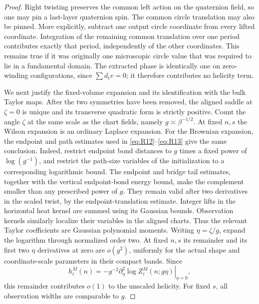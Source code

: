 \begin{proof}
Right twisting preserves the common left action on the quaternion field,
so one may pin a last-layer quaternion spin. The common circle translation
may also be pinned. More explicitly, subtract one output circle coordinate
from every lifted coordinate. Integration of the remaining common
translation over one period contributes exactly that period, independently
of the other coordinates. This remains true if it was originally one
microscopic circle value that was required to lie in a fundamental domain.
The extracted phase is identically one on zero-winding configurations,
since $\sum d_t v=0$; it therefore contributes no helicity term.

We next justify the fixed-volume expansion and its identification with the
bulk Taylor maps. After the two symmetries have been removed, the aligned
saddle at $\zeta=0$ is unique and its transverse quadratic form is strictly
positive. Count the angle $\zeta$ at the same scale as the chart fields,
namely $g\asymp\beta^{-1/2}$. At fixed $n,s$ the Wilson expansion is an
ordinary Laplace expansion. For the Brownian expansion, the endpoint and
path estimates used in \eqref{eq:R12}--\eqref{eq:R13} give the same
conclusion. Indeed, restrict endpoint bond distances to $g$ times a fixed
power of $\log(g^{-1})$, and restrict the path-size variables of the
initialization to a corresponding logarithmic bound. The endpoint and
bridge tail estimates, together with the vertical endpoint-bond energy
bound, make the complement smaller than any prescribed power of $g$.
They remain valid after two derivatives in the scaled twist, by the
endpoint-translation estimate. Integer lifts in the horizontal heat
kernel are summed using its Gaussian bounds. Observation kernels similarly
localize their variables in the aligned charts. Thus the relevant Taylor
coefficients are Gaussian polynomial moments. Writing $\eta=\zeta/g$,
expand the logarithm through normalized order two. At fixed $n,s$ its
remainder and its first two $\eta$ derivatives at zero are $o(g^2)$,
uniformly for the actual shape and coordinate-scale parameters in
their compact bands. Since
\[
 h_i^M(n)=-g^{-2}\left.\partial_\eta^2
                    \log Z_i^M(n;g\eta)\right|_{\eta=0},
\]
this remainder contributes $o(1)$ to the unscaled helicity. For fixed $s$,
all observation widths are comparable to $g$.


\end{proof}
